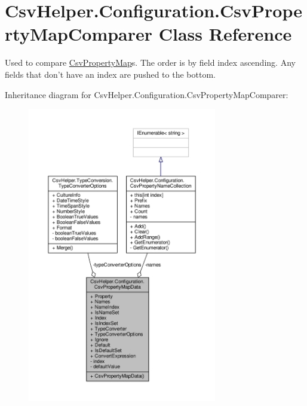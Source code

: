\hypertarget{a00052}{\section{Csv\-Helper.\-Configuration.\-Csv\-Property\-Map\-Comparer Class Reference}
\label{a00052}
}


Used to compare \hyperlink{a00050}{Csv\-Property\-Map}s. The order is by field index ascending. Any fields that don't have an index are pushed to the bottom.  




Inheritance diagram for Csv\-Helper.\-Configuration.\-Csv\-Property\-Map\-Comparer\-:
\nopagebreak
\begin{figure}[H]
\begin{center}
\leavevmode
\includegraphics[width=234pt]{db/d43/a00422}
\end{center}
\end{figure}



